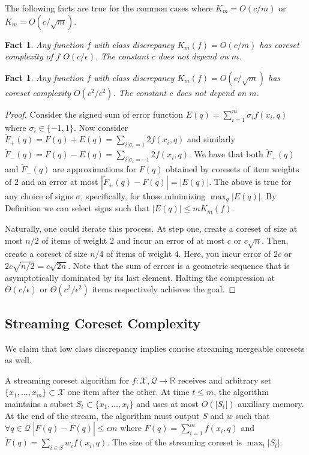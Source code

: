 \documentclass[anon,12pt]{colt2019} %
\newtheorem{fact}[theorem]{Fact}
\newcommand{\R}{\mathbb{R}}
\newcommand{\eps}{\epsilon}
\newcommand{\X}{\mathcal{X}}
\newcommand{\Q}{\mathcal{Q}}
\begin{document}
\noindent The following facts are true for the common cases where $K_m = O(c/m)$ or $K_m = O(c/\sqrt{m})$.
\begin{fact}
Any function $f$ with class discrepancy $K_m(f) = O(c/m)$ has coreset complexity of $f$ $O(c/\eps)$.
The constant $c$ does not depend on $m$.
\end{fact}
\begin{fact}
Any function $f$ with class discrepancy $K_m(f) = O(c/\sqrt{m})$ has coreset complexity $O(c^2/\eps^2)$.
The constant $c$ does not depend on $m$.
\end{fact}
\begin{proof}
\noindent  Consider the signed sum of error function $E(q) = \sum_{i=1}^{m} \sigma_i f(x_i,q)$ where $\sigma_i \in \{-1,1\}$.
Now consider $\tilde F_{+}(q) = F(q) + E(q)   = \sum_{i | \sigma_i=1} 2 f(x_i,q)$ and similarly $\tilde F_{-}(q) = F(q) - E(q)  =  \sum_{i | \sigma_i=-1} 2 f(x_i,q)$. We have that both $\tilde F_{+}(q)$ and $\tilde F_{-}(q)$ are approximations for $F(q)$ obtained by coresets of item weights of $2$ and an error at most $|\tilde F_{\pm}(q)- F(q)| =  |E(q)|$. The above is true for any choice of signs $\sigma$, specifically, for those minimizing $\max_q | E(q)|$.
By Definition we can select signs such that $|E(q)| \le m K_m(f)$.

Naturally, one could iterate this process.
At step one, create a coreset of size at most $n/2$ of items of weight $2$ and incur an error of at most $c$ or $c \sqrt{n}$.
Then, create a coreset of size $n/4$ of items of weight $4$. Here, you incur error of $2c$ or $2c\sqrt{n/2}  = c\sqrt{2n}$.
Note that the sum of errors is a geometric sequence that is asymptotically dominated by its last element. 
Halting the compression at $\Theta(c/\eps)$ or $\Theta(c^2/\eps^2)$ items respectively achieves the goal.
\end{proof}

\subsection{Streaming Coreset Complexity}\label{sec:sketch}
We claim that low class discrepancy implies concise streaming mergeable coresets as well. 
%
\begin{definition}  
A streaming coreset algorithm for $f:\X,\Q \rightarrow \R$ receives and arbitrary set $\{x_1,\ldots,x_m\} \subset \X$ one item after the other.
At time $t \le m$, the algorithm maintains a subset $S_t \subset \{x_1,\ldots,x_t\}$ and uses at most $O(|S_t|)$ auxiliary memory. 
At the end of the stream, the algorithm must output $S$ and $w$ such that  $\forall q \in \Q \; |F(q)  - \tilde F(q)| \le \eps m$ where 
$F(q) = \sum_{i=1}^{m} f(x_i,q)$ and $\tilde F(q) = \sum_{i \in S}w_i f(x_i,q)$.
The size of the streaming coreset is $\max_t |S_t|$.
\end{definition}
\end{document}
